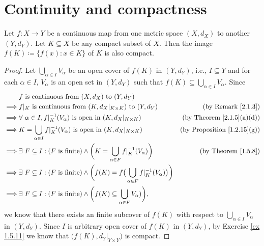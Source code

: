 \section{Continuity and compactness}\label{sec 2.3}

\begin{theorem}\label{2.3.1}
    Let \(f : X \to Y\) be a continuous map from one metric space \((X, d_X)\) to another \((Y, d_Y)\).
    Let \(K \subseteq X\) be any compact subset of \(X\).
    Then the image \(f(K) \coloneqq \{f(x) : x \in K\}\) of \(K\) is also compact.
\end{theorem}

\begin{proof}
    Let \(\bigcup_{\alpha \in I} V_\alpha\) be an open cover of \(f(K)\) in \((Y, d_Y)\), i.e., \(I \subseteq Y\) and for each \(\alpha \in I\), \(V_{\alpha}\) is an open set in \((Y, d_Y)\) such that \(f(K) \subseteq \bigcup_{\alpha \in I} V_\alpha\).
    Since
    \begin{align*}
                 & f \text{ is continuous from } (X, d_X) \text{ to } (Y, d_Y)                                                                                                             \\
        \implies & f|_K \text{ is continuous from } (K, d_X|_{K \times K}) \text{ to } (Y, d_Y)                                                  & \text{(by Remark \ref{2.1.3})}          \\
        \implies & \forall\ \alpha \in I, f|_K^{-1}(V_\alpha) \text{ is open in } (K, d_X|_{K \times K})                                         & \text{(by Theorem \ref{2.1.5}(a)(d))}   \\
        \implies & K = \bigcup_{\alpha \in I} f|_K^{-1}(V_\alpha) \text{ is open in } (K, d_X|_{K \times K})                                     & \text{(by Proposition \ref{1.2.15}(g))} \\
        \implies & \exists\ F \subseteq I : (F \text{ is finite}) \land \bigg(K = \bigcup_{\alpha \in F} f|_K^{-1}(V_\alpha)\bigg)               & \text{(by Theorem \ref{1.5.8})}         \\
        \implies & \exists\ F \subseteq I : (F \text{ is finite}) \land \bigg(f(K) = f\big(\bigcup_{\alpha \in F} f|_K^{-1}(V_\alpha)\big)\bigg)                                           \\
        \implies & \exists\ F \subseteq I : (F \text{ is finite}) \land \bigg(f(K) \subseteq \bigcup_{\alpha \in F} V_\alpha)\bigg),
    \end{align*}
    we know that there exists an finite subcover of \(f(K)\) with respect to \(\bigcup_{\alpha \in I} V_\alpha\) in \((Y, d_Y)\).
    Since \(I\) is arbitrary open cover of \(f(K)\) in \((Y, d_Y)\), by Exercise \ref{ex 1.5.11} we know that \(\big(f(K), d_Y|_{Y \times Y}\big)\) is compact.
\end{proof}
